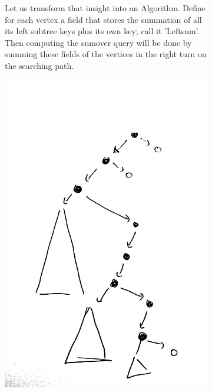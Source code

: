 \begin{figure}[H]
\begin{subfigure}[b]{0.47\textwidth}
Let us transform that insight into an 
Algorithm. Define for each vertex a field that stores the summation of all its left subtree keys plus its own key; call it 'Leftsum'.  
Then computing the sumover query will be done by summing these fields of the vertices in the right turn on the searching path. 
\end{subfigure} 
\hfill
\begin{subfigure}[b]{0.49\textwidth}
  \includegraphics[scale=0.07]{oavl-q.png}
   \end{subfigure} 
   \hfill
\end{figure}



  \begin{algorithm}[H]
  \end{algorithm}


